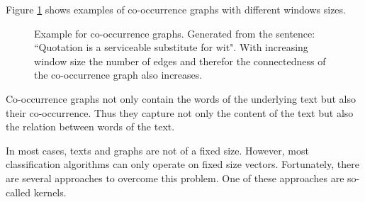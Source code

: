 Figure \ref{fig:cooccurrence_graphs} shows examples of co-occurrence graphs with different windows sizes.

\begin{figure}[ht]%
    \centering
    \caption{Example for co-occurrence graphs. Generated from the sentence: ``Quotation is a serviceable substitute for wit". With increasing window size the number of edges and therefor the connectedness of the co-occurrence graph also increases.}%
    \label{fig:cooccurrence_graphs}%
\end{figure}

Co-occurrence graphs not only contain the words of the underlying text but also their co-occurrence. Thus they capture not only the content of the text but also the relation between words of the text.

In most cases, texts and graphs are not of a fixed size.
However, most classification algorithms can only operate on fixed size vectors.
Fortunately, there are several approaches to overcome this problem.
One of these approaches are so-called kernels.

